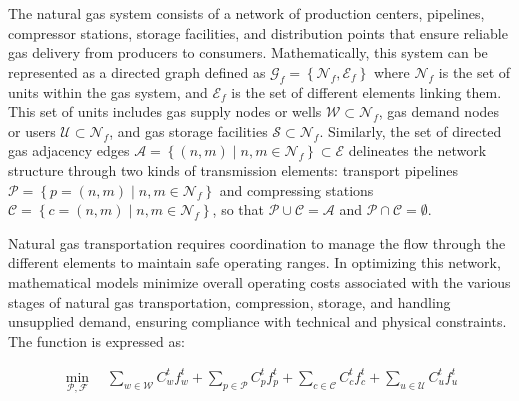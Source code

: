 The natural gas system consists of a network of production centers, pipelines, compressor stations, storage facilities, and distribution points that ensure reliable gas delivery from producers to consumers. Mathematically, this system can be represented as a directed graph defined as $\mathcal{G}_f = \left\{\mathcal{N}_f, \mathcal{E}_f\right\}$ where $\mathcal{N}_f$ is the set of units within the gas system, and $ \mathcal{E}_f$ is the set of different elements linking them. This set of units includes gas supply nodes or wells $\mathcal{W} \subset \mathcal{N}_{f}$, gas demand nodes or users $\mathcal{U} \subset \mathcal{N}_{f}$, and gas storage facilities $\mathcal{S} \subset \mathcal{N}_{f}$. Similarly, the set of directed gas adjacency edges $\mathcal{A} = \left\{(n,m) \mid n,m\in\mathcal{N}_f \right\} \subset \mathcal{E}$ delineates the network structure through two kinds of transmission elements: transport pipelines $\mathcal{P} = \left\{p=(n,m) \mid n,m\in\mathcal{N}_f \right\}$ and compressing stations $\mathcal{C} = \left\{c=(n,m) \mid n,m\in\mathcal{N}_f \right\}$, so that $\mathcal{P}\cup\mathcal{C}=\mathcal{A}$ and $\mathcal{P}\cap\mathcal{C}=\emptyset$.


Natural gas transportation requires coordination to manage the flow through the different elements to maintain safe operating ranges. In optimizing this network, mathematical models minimize overall operating costs associated with the various stages of natural gas transportation, compression, storage, and handling unsupplied demand, ensuring compliance with technical and physical constraints. The function is expressed as:


\begin{equation} \label{eq:obj_func_linear_gas}
    \begin{split}
    \min_{\mathcal{P}, \mathcal{F}} \quad  \sum_{w \in \mathcal{W}} C_{w}^t {f_{w}^t} + \sum_{p \in \mathcal{P}} C_{p}^t {f_{p}^t} + \sum_{c \in \mathcal{C}} C_{c}^t {f_{c}^t} + \sum_{u \in \mathcal{U}} C_{u}^{t} {f_{u}^{t}} 
    \end{split}
\end{equation}


